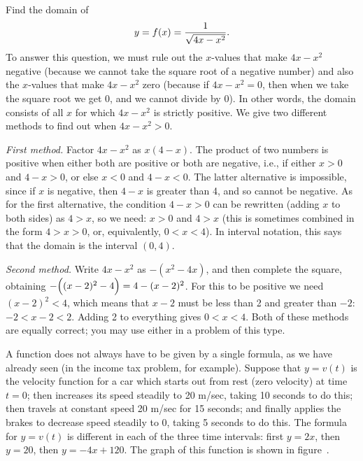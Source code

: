 \begin{example}
Find the domain of 
$$
 y=f(x)={1\over\sqrt{4x-x^2}}.
$$
To answer this question, we must rule out the $x$-values that make
$4x-x^2$ negative (because we cannot take the square root of a
negative number)
and also the $x$-values that make $4x-x^2$ zero (because if $4x-x^2=0$, then
when we take the square root we get 0, and we cannot divide by 0).
In other words, the domain consists of all $x$ for which $4x-x^2$ is
strictly positive.  We give two different methods to find out when  $
4x-x^2>0$.

{\it First method.} Factor $4x-x^2$ as $x(4-x)$.  The product of two numbers
is positive when either both are positive or both are negative, i.e., if
either $x>0$ and $4-x>0$, or else $x<0$ and $4-x<0$.  The latter alternative
is impossible, since if $x$ is negative, then $4-x$ is greater than 4, and
so cannot be negative.  As for the first alternative, the condition $4-x>0$
can be rewritten (adding $x$ to both sides) as $4>x$, so we need:
$x>0$ and $4>x$ (this is sometimes combined in the form $4>x>0$, or,
equivalently, $0<x<4$).  In interval notation, this says that the domain
is the interval $(0,4)$.

{\it Second method.}  Write $4x-x^2$ as $-(x^2-4x)$, and then complete
the square, obtaining $-\Bigl((x-2)^2-4\Bigr)=4-(x-2)^2$.  For this
to be positive we need $(x-2)^2<4$, which means that $x-2$ must be less
than 2 and greater than $-2$:  $-2<x-2<2$.  Adding 2 to everything gives
$0<x<4$.  Both of these methods are equally correct; you may use either
in a problem of this type.
\end{example}

A function does not always have to be given by a single formula, as we
have already seen (in the income tax problem, for example).  
Suppose that $y=v(t)$ is the velocity function for a car
which starts out from rest (zero velocity) at time $t=0$; then
increases its speed steadily to 20 m/sec, taking 10 seconds to do
this; then travels at constant speed 20 m/sec for 15 seconds; and
finally applies the brakes to decrease speed steadily to 0, taking 5
seconds to do this.  The formula for $y=v(t)$ is different in each of
the three time intervals: first $y=2x$, then $y=20$, then $y=-4x+120$.
The graph of this function is shown in figure~.


